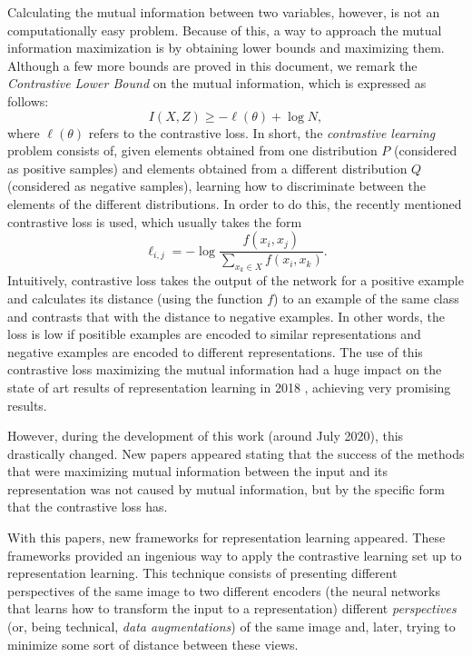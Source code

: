 Calculating the mutual information between two variables, however, is not an computationally easy problem. Because of this, a way to approach the mutual information maximization is by obtaining lower bounds and maximizing them. Although a few more bounds are proved in this document, we remark the \emph{Contrastive Lower Bound} on the mutual information, which is expressed as follows:
\[
I(X,Z)  \geq - \ell(\theta) + \log N,
\]
where $\ell(\theta)$ refers to the contrastive loss. In short, the \emph{contrastive learning} problem consists of, given elements obtained from one distribution $P$ (considered as positive samples) and elements obtained from a different distribution $Q$ (considered as negative samples), learning how to discriminate between the elements of the different distributions. In order to do this, the recently mentioned contrastive loss is used, which usually takes the form
\[
\ell_{i,j} = -  \log \frac{f(x_i,x_j)}{\sum_{x_k \in X}f(x_i,x_k)}.
\] 
Intuitively, contrastive loss takes the output of the network for a positive example and calculates its distance (using the function $f$) to an example of the same class and contrasts that with the distance to negative examples. In other words, the loss is low if positible examples are encoded to similar representations and negative examples are encoded to different representations. The use of this contrastive loss maximizing the mutual information had a huge impact on the state of art results of representation learning in 2018 \citep{oord_representation_2019}, achieving very promising results.

However, during the development of this work (around July 2020), this drastically changed. New papers  \citep{chen_simple_2020, grill2020bootstrap} appeared stating that the success of the methods that were maximizing mutual information between the input and its representation was not caused by mutual information, but by the specific form that the contrastive loss has.

With this papers, new frameworks for representation learning appeared. These frameworks provided an ingenious way to apply  the contrastive learning set up to representation learning. This technique consists of presenting different perspectives of the same image to two different encoders (the neural networks that learns how to transform the input to a representation) different \emph{perspectives} (or, being technical, \emph{data augmentations}) of the same image and, later, trying to minimize some sort of distance between these views.  

